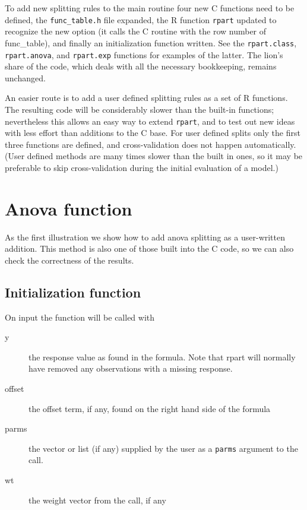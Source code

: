 To add new splitting rules to the main routine
four new C functions need to be defined, the
\texttt{func\_table.h} file expanded, the R function \texttt{rpart} updated to
recognize the new
option (it calls the C routine with the row number of func\_table),
and finally an initialization function written.
See the \texttt{rpart.class}, \texttt{rpart.anova}, and \texttt{rpart.exp}
functions for examples of the latter.
The lion's share of the code, which deals with all the necessary bookkeeping,
remains unchanged.

An easier route is to add a user defined splitting rules as a set of R functions.
The resulting code will be considerably slower than the built-in functions;
nevertheless this allows an easy way to extend \texttt{rpart}, and to
test out new
ideas with less effort than additions to the C base.
For user defined splits only the first three functions are defined,
and cross-validation does not happen automatically.
(User defined methods are many times slower than the built in ones, so
it may be preferable to skip cross-validation during the initial evaluation
of a model.)

\section{Anova function}
As the first illustration we show how to add anova splitting as a user-written
addition.
This method is also one of those built into the C code, so we can also
check the correctness of the results.

\subsection{Initialization function}

\Rcodeplaceholder{}

On input the function will be called with
\begin{description}
  \item[y] the response value as found in the formula.
    Note that rpart will normally
    have removed any observations with a missing response.
  \item[offset] the offset term, if any, found on the right hand side of the formula
  \item[parms] the vector or list (if any) supplied by the user as a
    \texttt{parms} argument to the call.
  \item[wt] the weight vector from the call, if any
  \end{description}

